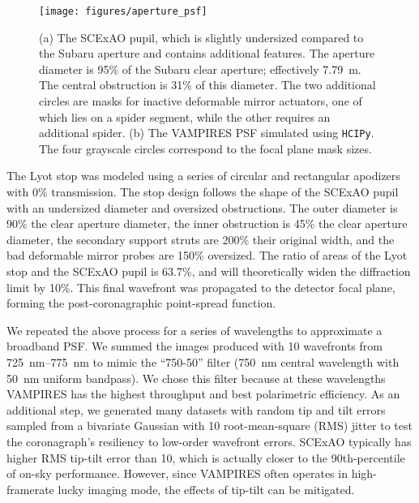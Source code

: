\documentclass[]{spie}  %
\begin{document}
\begin{figure}
   \centering
   \texttt{[image: figures/aperture\_psf]}
   \caption{(a) The SCExAO pupil, which is slightly undersized compared to the Subaru aperture and contains additional features. The aperture diameter is 95\% of the Subaru clear aperture; effectively \qty{7.79}{\meter}. The central obstruction is 31\% of this diameter. The two additional circles are masks for inactive deformable mirror actuators, one of which lies on a spider segment, while the other requires an additional spider. (b) The VAMPIRES PSF simulated using \texttt{HCIPy}. The four grayscale circles correspond to the focal plane mask sizes.}\label{fig:pupil}
\end{figure}

The Lyot stop was modeled using a series of circular and rectangular apodizers with 0\% transmission. The stop design follows the shape of the SCExAO pupil with an undersized diameter and oversized obstructions. The outer diameter is 90\% the clear aperture diameter, the inner obstruction is 45\% the clear aperture diameter, the secondary support struts are 200\% their original width, and the bad deformable mirror probes are 150\% oversized. The ratio of areas of the Lyot stop and the SCExAO pupil is 63.7\%, and will theoretically widen the diffraction limit by 10\%. This final wavefront was propagated to the detector focal plane, forming the post-coronagraphic point-spread function.

We repeated the above process for a series of wavelengths to approximate a broadband PSF. We summed the images produced with 10 wavefronts from \qtyrange{725}{775}{\nano\meter} to mimic the ``750-50'' filter (\qty{750}{\nano\meter} central wavelength with \qty{50}{\nano\meter} uniform bandpass). We chose this filter because at these wavelengths VAMPIRES has the highest throughput and best polarimetric efficiency. As an additional step, we generated many datasets with random tip and tilt errors sampled from a bivariate Gaussian with \qty{10}{\milliarcsecond} root-mean-square (RMS) jitter to test the coronagraph's resiliency to low-order wavefront errors. SCExAO typically has higher RMS tip-tilt error than \qty{10}{\milliarcsecond}, which is actually closer to the 90th-percentile of on-sky performance. However, since VAMPIRES often operates in high-framerate lucky imaging mode, the effects of tip-tilt can be mitigated.
\end{document}
